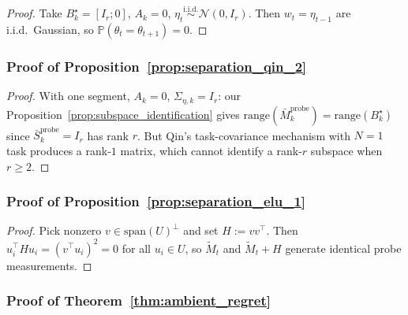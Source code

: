 \documentclass{article}
\newcommand{\Prob}{\mathbb{P}}
\newcommand{\range}{\mathrm{range}}
\newcommand{\Span}{\mathrm{span}}
\begin{document}
\begin{proof}
Take $B_k^\star = [I_r; 0]$, $A_k = 0$, $\eta_t \stackrel{\mathrm{i.i.d.}}{\sim} \mathcal N(0,I_r)$.
Then $w_t = \eta_{t-1}$ are i.i.d.\ Gaussian, so $\Prob(\theta_t = \theta_{t+1}) = 0$.
\end{proof}

\subsubsection{Proof of Proposition~\ref{prop:separation_qin_2}}
\label{proof:separation_qin_2}

\begin{proof}
With one segment, $A_k = 0$, $\Sigma_{\eta,k} = I_r$: our Proposition~\ref{prop:subspace_identification} gives $\range(\bar M_k^{\mathrm{probe}}) = \range(B_k^\star)$ since $\bar S_k^{\mathrm{probe}} = I_r$ has rank $r$.
But Qin's task-covariance mechanism with $N=1$ task produces a rank-$1$ matrix, which cannot identify a rank-$r$ subspace when $r \ge 2$.
\end{proof}

\subsubsection{Proof of Proposition~\ref{prop:separation_elu_1}}
\label{proof:separation_elu_1}

\begin{proof}
Pick nonzero $v \in \Span(U)^\perp$ and set $H := vv^\top$.
Then $u_i^\top H u_i = (v^\top u_i)^2 = 0$ for all $u_i \in U$, so $\widetilde M_t$ and $\widetilde M_t + H$ generate identical probe measurements.
\end{proof}

\subsubsection{Proof of Theorem~\ref{thm:ambient_regret}}
\label{proof:ambient_regret}
\end{document}
